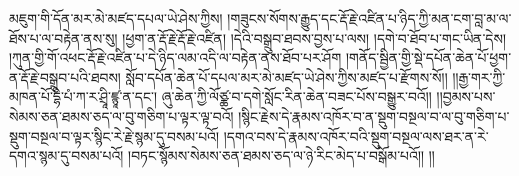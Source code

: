 མཇུག་གི་དོན་མར་མེ་མཛད་དཔལ་ཡེ་ཤེས་ཀྱིས། །གཟུངས་སོགས་རྒྱུད་དང་རྡོ་རྗེ་འཛིན་པ་ཉིད་ཀྱི་མན་ངག་བླ་མ་ལ་ཐོས་པ་ལ་བརྟེན་ནས་སུ། །ཕྱག་ན་རྡོ་རྗེ་རྡོ་རྗེ་འཛིན། །དེའི་བསྒྲུབ་ཐབས་བྱས་པ་ལས། །དགེ་བ་ཐོབ་པ་གང་ཡིན་དེས། །ཀུན་གྱི་གོ་འཕང་རྡོ་རྗེ་འཛིན་པ་དེ་ཉིད་ལམ་འདི་ལ་བརྟེན་ནས་ཐོབ་པར་ཤོག །གནོད་སྦྱིན་གྱི་སྡེ་དཔོན་ཆེན་པོ་ཕྱག་ན་རྡོ་རྗེ་བསྒྲུབ་པའི་ཐབས། སློབ་དཔོན་ཆེན་པོ་དཔལ་མར་མེ་མཛད་ཡེ་ཤེས་ཀྱིས་མཛད་པ་རྫོགས་སོ།། །།རྒྱ་གར་ཀྱི་མཁན་པོ་དྷི་པཾ་ཀ་ར་ཤྲཱི་ཛྙཱ་ན་དང་། ཞུ་ཆེན་ཀྱི་ལོཙྪ་བ་དགེ་སློང་རིན་ཆེན་བཟང་པོས་བསྒྱུར་བའོ།། །།བྱམས་པས་སེམས་ཅན་ཐམས་ཅད་ལ་བུ་གཅིག་པ་ལྟར་ལྟ་བའོ། །སྙིང་རྗེས་དེ་རྣམས་འཁོར་བ་ན་སྡུག་བསྔལ་བ་ལ་བུ་གཅིག་པ་སྡུག་བསྔལ་བ་ལྟར་སྙིང་རེ་རྗེ་སྙམ་དུ་བསམ་པའོ། །དགའ་བས་དེ་རྣམས་འཁོར་བའི་སྡུག་བསྔལ་ལས་ཐར་ན་རེ་དགའ་སྙམ་དུ་བསམ་པའོ། །བཏང་སྙོམས་སེམས་ཅན་ཐམས་ཅད་ལ་ཉེ་རིང་མེད་པ་བསྒོམ་པའོ།། །།